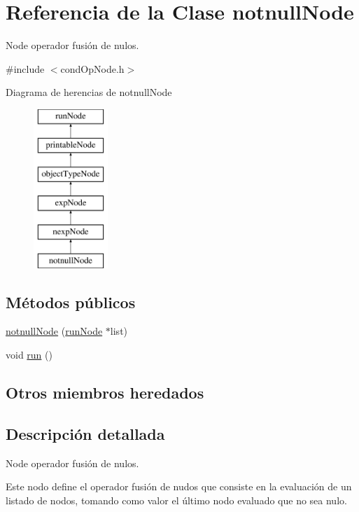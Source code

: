 \hypertarget{classnotnullNode}{\section{Referencia de la Clase notnull\-Node}
\label{classnotnullNode}
}


Node operador fusión de nulos.  




{\ttfamily \#include $<$cond\-Op\-Node.\-h$>$}

Diagrama de herencias de notnull\-Node\begin{figure}[H]
\begin{center}
\leavevmode
\includegraphics[height=6.000000cm]{classnotnullNode}
\end{center}
\end{figure}
\subsection*{Métodos públicos}
\begin{DoxyCompactItemize}
\item 
\hyperlink{classnotnullNode_af700de8b7f9f5ba309212d2819fd9610}{notnull\-Node} (\hyperlink{classrunNode}{run\-Node} $\ast$list)
\item 
void \hyperlink{classnotnullNode_a5dce7fd752570604933feeadd6e5d973}{run} ()
\end{DoxyCompactItemize}
\subsection*{Otros miembros heredados}


\subsection{Descripción detallada}
Node operador fusión de nulos. 

Este nodo define el operador fusión de nudos que consiste en la evaluación de un listado de nodos, tomando como valor el último nodo evaluado que no sea nulo. 

